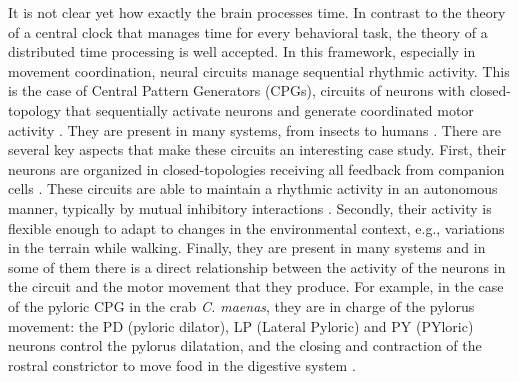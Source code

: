 It is not clear yet how exactly the brain processes time. In contrast to the theory of a central clock that manages time for every behavioral task, the theory of a distributed time processing \parencite{buonomano_temporal_1995,ivry_representation_1996} is well accepted. In this framework, especially in movement coordination, neural circuits manage sequential rhythmic activity. This is the case of Central Pattern Generators (CPGs), circuits of neurons with closed-topology that sequentially activate neurons and generate coordinated motor activity \parencite{selverston_reliable_2000}. They are present in many systems, from insects to humans \parencite{pearson_central_1972,marder_central_2001,mackay-lyons_central_2002,minassian_human_2017}. There are several key aspects that make these circuits an interesting case study. First, their neurons are organized in closed-topologies receiving all feedback from companion cells \parencite{huerta_topology_2001}. These circuits are able to maintain a rhythmic activity in an autonomous manner, typically by mutual inhibitory interactions \parencite{katz_evolution_2016}. Secondly, their activity is flexible enough to adapt to changes in the environmental context, e.g., variations in the terrain while walking. Finally, they are present in many systems and in some of them there is a direct relationship between the activity of the neurons in the circuit and the motor movement that they produce. For example, in the case of the pyloric CPG in the crab \textit{C. maenas}, they are in charge of the pylorus movement: the PD (pyloric dilator), LP (Lateral Pyloric) and PY (PYloric) neurons control the pylorus dilatation, and the closing and contraction of the rostral constrictor to move food in the digestive system \parencite{moulins_introduction_1987,selverston_oscillations_2006}.

